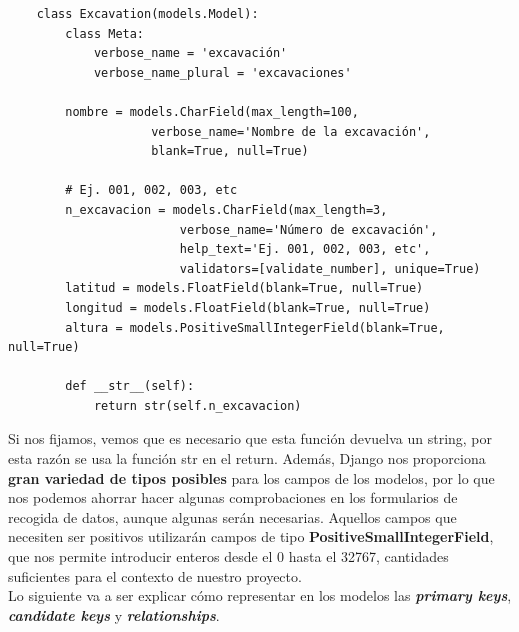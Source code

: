     
    \begin{verbatim}
    class Excavation(models.Model):
        class Meta:
            verbose_name = 'excavación'
            verbose_name_plural = 'excavaciones'

        nombre = models.CharField(max_length=100,
                    verbose_name='Nombre de la excavación',
                    blank=True, null=True)

        # Ej. 001, 002, 003, etc
        n_excavacion = models.CharField(max_length=3,
                        verbose_name='Número de excavación',
                        help_text='Ej. 001, 002, 003, etc', 
                        validators=[validate_number], unique=True)      
        latitud = models.FloatField(blank=True, null=True)
        longitud = models.FloatField(blank=True, null=True)
        altura = models.PositiveSmallIntegerField(blank=True, null=True)

        def __str__(self):
            return str(self.n_excavacion)
    \end{verbatim}

    Si nos fijamos, vemos que es necesario que esta función devuelva un string, por esta
    razón se usa la función str en el return. Además, Django nos proporciona \textbf{gran
    variedad de tipos posibles} para los campos de los modelos, por lo que nos podemos
    ahorrar hacer algunas comprobaciones en los formularios de recogida de datos, aunque
    algunas serán necesarias. Aquellos campos que necesiten ser positivos
    utilizarán campos de tipo \textbf{PositiveSmallIntegerField}, que nos permite introducir
    enteros desde el 0 hasta el 32767, cantidades suficientes para el contexto de nuestro
    proyecto.\\

    Lo siguiente va a ser explicar cómo representar en los modelos las
    \textbf{\textit{primary keys}}, \textbf{\textit{candidate keys}} y
    \textbf{\textit{relationships}}.\\
    
